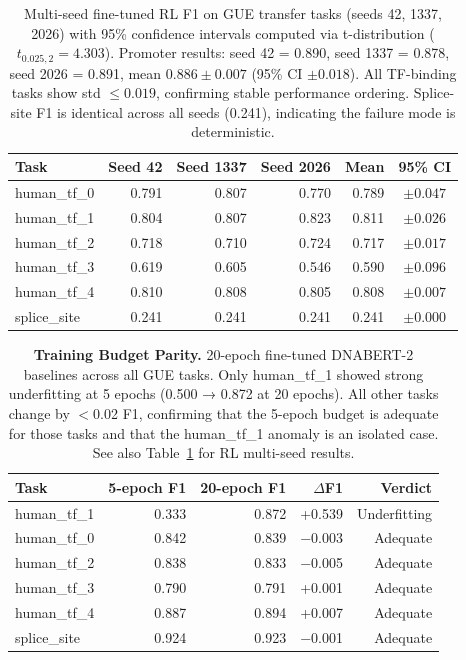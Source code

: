 \documentclass[sigconf,screen]{acmart}
\newcommand{\dnabert}{DNABERT-2\xspace}
\begin{document}
\begin{table}[H]
    \centering
    \caption{Multi-seed fine-tuned RL F1 on GUE transfer tasks (seeds 42, 1337, 2026) with 95\% confidence intervals computed via t-distribution ($t_{0.025,2}=4.303$). Promoter results: seed 42 = 0.890, seed 1337 = 0.878, seed 2026 = 0.891, mean $0.886\pm0.007$ (95\% CI $\pm0.018$). All TF-binding tasks show std $\leq 0.019$, confirming stable performance ordering. Splice-site F1 is identical across all seeds (0.241), indicating the failure mode is deterministic.}
    \label{tab:multiseed}
    \begin{tabular}{lrrrrc}
        \toprule
        Task & Seed 42 & Seed 1337 & Seed 2026 & Mean & 95\% CI \\
        \midrule
        human\_tf\_0  & 0.791 & 0.807 & 0.770 & 0.789 & $\pm 0.047$ \\
        human\_tf\_1  & 0.804 & 0.807 & 0.823 & 0.811 & $\pm 0.026$ \\
        human\_tf\_2  & 0.718 & 0.710 & 0.724 & 0.717 & $\pm 0.017$ \\
        human\_tf\_3  & 0.619 & 0.605 & 0.546 & 0.590 & $\pm 0.096$ \\
        human\_tf\_4  & 0.810 & 0.808 & 0.805 & 0.808 & $\pm 0.007$ \\
        splice\_site  & 0.241 & 0.241 & 0.241 & 0.241 & $\pm 0.000$ \\
        \bottomrule
    \end{tabular}
\end{table}

\begin{table}[H]
    \centering
    \small
    \caption{\textbf{Training Budget Parity.} 20-epoch fine-tuned \dnabert baselines across all GUE tasks. Only human\_tf\_1 showed strong underfitting at 5 epochs (0.500 → 0.872 at 20 epochs). All other tasks change by $<$0.02 F1, confirming that the 5-epoch budget is adequate for those tasks and that the human\_tf\_1 anomaly is an isolated case. See also Table~\ref{tab:multiseed} for RL multi-seed results.}
    \label{tab:budget_parity}
    \begin{tabular}{lrrrr}
        \toprule
        Task & 5-epoch F1 & 20-epoch F1 & $\Delta$F1 & Verdict \\
        \midrule
        human\_tf\_1  & 0.333 & 0.872 & +0.539 & Underfitting \\
        human\_tf\_0  & 0.842 & 0.839 & $-$0.003 & Adequate \\
        human\_tf\_2  & 0.838 & 0.833 & $-$0.005 & Adequate \\
        human\_tf\_3  & 0.790 & 0.791 & +0.001 & Adequate \\
        human\_tf\_4  & 0.887 & 0.894 & +0.007 & Adequate \\
        splice\_site  & 0.924 & 0.923 & $-$0.001 & Adequate \\
        \bottomrule
    \end{tabular}
\end{table}
\end{document}
